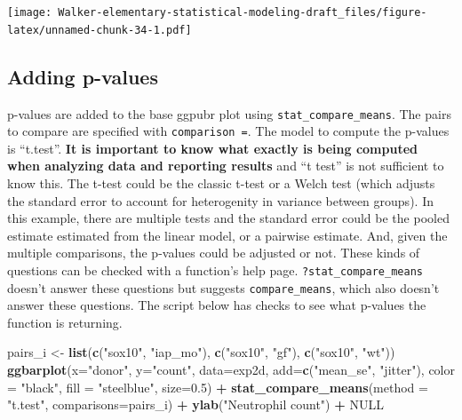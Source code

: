 \documentclass[]{book}
\newenvironment{Shaded}{\begin{snugshade}}{\end{snugshade}}
\newcommand{\KeywordTok}[1]{\textcolor[rgb]{0.13,0.29,0.53}{\textbf{#1}}}
\newcommand{\DataTypeTok}[1]{\textcolor[rgb]{0.13,0.29,0.53}{#1}}
\newcommand{\FloatTok}[1]{\textcolor[rgb]{0.00,0.00,0.81}{#1}}
\newcommand{\StringTok}[1]{\textcolor[rgb]{0.31,0.60,0.02}{#1}}
\newcommand{\OtherTok}[1]{\textcolor[rgb]{0.56,0.35,0.01}{#1}}
\newcommand{\OperatorTok}[1]{\textcolor[rgb]{0.81,0.36,0.00}{\textbf{#1}}}
\newcommand{\NormalTok}[1]{#1}
\begin{document}
\texttt{[image: Walker-elementary-statistical-modeling-draft\_files/figure-latex/unnamed-chunk-34-1.pdf]}

\subsection{Adding p-values}\label{adding-p-values}

p-values are added to the base ggpubr plot using
\texttt{stat\_compare\_means}. The pairs to compare are specified with
\texttt{comparison\ =}. The model to compute the p-values is ``t.test''.
\textbf{It is important to know what exactly is being computed when
analyzing data and reporting results} and ``t test'' is not sufficient
to know this. The t-test could be the classic t-test or a Welch test
(which adjusts the standard error to account for heterogenity in
variance between groups). In this example, there are multiple tests and
the standard error could be the pooled estimate estimated from the
linear model, or a pairwise estimate. And, given the multiple
comparisons, the p-values could be adjusted or not. These kinds of
questions can be checked with a function's help page.
\texttt{?stat\_compare\_means} doesn't answer these questions but
suggests \texttt{compare\_means}, which also doesn't answer these
questions. The script below has checks to see what p-values the function
is returning.

\begin{Shaded}
\begin{Highlighting}[]
\NormalTok{pairs_i <-}\StringTok{ }\KeywordTok{list}\NormalTok{(}\KeywordTok{c}\NormalTok{(}\StringTok{"sox10"}\NormalTok{, }\StringTok{"iap_mo"}\NormalTok{), }\KeywordTok{c}\NormalTok{(}\StringTok{"sox10"}\NormalTok{, }\StringTok{"gf"}\NormalTok{), }\KeywordTok{c}\NormalTok{(}\StringTok{"sox10"}\NormalTok{, }\StringTok{"wt"}\NormalTok{))}
\KeywordTok{ggbarplot}\NormalTok{(}\DataTypeTok{x=}\StringTok{"donor"}\NormalTok{, }
          \DataTypeTok{y=}\StringTok{"count"}\NormalTok{, }
          \DataTypeTok{data=}\NormalTok{exp2d,}
          \DataTypeTok{add=}\KeywordTok{c}\NormalTok{(}\StringTok{"mean_se"}\NormalTok{, }\StringTok{"jitter"}\NormalTok{),}
          \DataTypeTok{color =} \StringTok{"black"}\NormalTok{,}
          \DataTypeTok{fill =} \StringTok{"steelblue"}\NormalTok{,}
          \DataTypeTok{size=}\FloatTok{0.5}\NormalTok{) }\OperatorTok{+}
\StringTok{  }\KeywordTok{stat_compare_means}\NormalTok{(}\DataTypeTok{method =} \StringTok{"t.test"}\NormalTok{, }\DataTypeTok{comparisons=}\NormalTok{pairs_i) }\OperatorTok{+}
\StringTok{  }\KeywordTok{ylab}\NormalTok{(}\StringTok{"Neutrophil count"}\NormalTok{) }\OperatorTok{+}
\StringTok{  }\OtherTok{NULL}
\end{Highlighting}
\end{Shaded}
\end{document}
